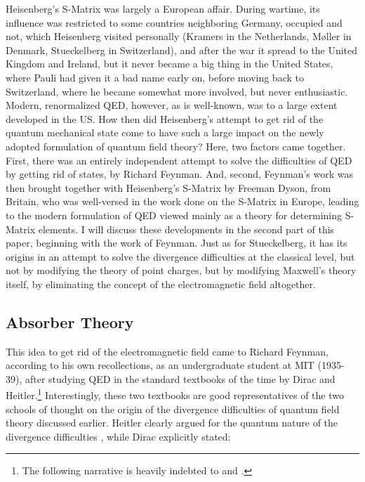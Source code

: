 \documentclass[12pt]{article}
\begin{document}
Heisenberg's S-Matrix was largely a European affair. During wartime, its influence was restricted to some countries neighboring Germany, occupied and not, which Heisenberg visited personally (Kramers in the Netherlands, M\o ller in Denmark, Stueckelberg in Switzerland), and after the war it spread to the United Kingdom and Ireland, but it never became a big thing in the United States, where Pauli had given it a bad name early on, before moving back to Switzerland, where he became somewhat more involved, but never enthusiastic. Modern, renormalized QED, however, as is well-known, was to a large extent developed in the US. How then did Heisenberg's attempt to get rid of the quantum mechanical state come to have such a large impact on the newly adopted formulation of quantum field theory? Here, two factors came together. First, there was an entirely independent attempt to solve the difficulties of QED by getting rid of states, by Richard Feynman. And, second, Feynman's work was then brought together with Heisenberg's S-Matrix by Freeman Dyson, from Britain, who was well-versed in the work done on the S-Matrix in Europe, leading to the modern formulation of QED viewed mainly as a theory for determining S-Matrix elements. I will discuss these developments in the second part of this paper, beginning with the work of Feynman. Just as for Stueckelberg, it has its origins in an attempt to solve the divergence difficulties at the classical level, but not by modifying the theory of point charges, but by modifying Maxwell's theory itself, by eliminating the concept of the electromagnetic field altogether.

\subsection{Absorber Theory}

This idea to get rid of the electromagnetic field came to Richard Feynman, according to his own recollections, as an undergraduate student at MIT (1935-39), after studying QED in the standard textbooks of the time by Dirac and Heitler.\footnote{The following narrative is heavily indebted to \citep{mehra_1994_the-beat} and \citep{schweber_1994_qed}.} Interestingly, these two textbooks are good representatives of the two schools of thought on the origin of the divergence difficulties of quantum field theory discussed earlier. Heitler clearly argued for the quantum nature of the divergence difficulties \citep[p. 183]{heitler_1936_the-quantum}, while Dirac explicitly stated:
\end{document}
